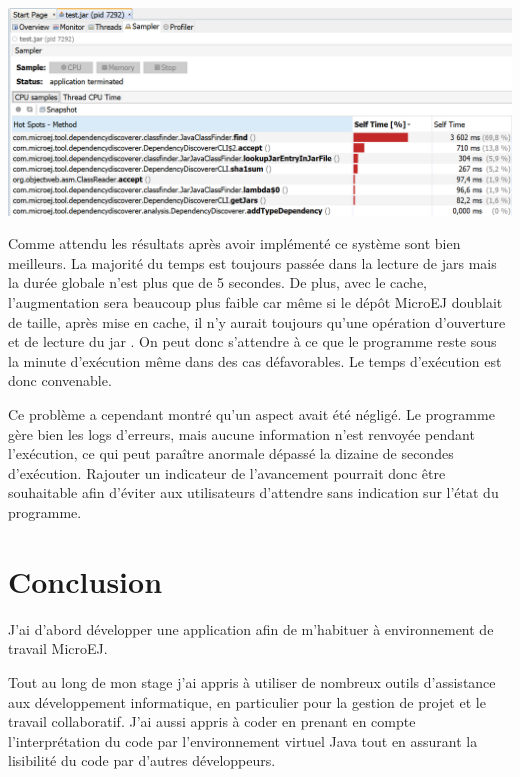 \documentclass[french,a4paper,12pt]{report}
\begin{document}
\begin{center}
\includegraphics[width=\textwidth]{./ressources/images/timeRepartitionByMethodsCachedsheer.png}
\end{center}

Comme attendu les résultats après avoir implémenté ce système sont bien meilleurs.
La majorité du temps est toujours passée dans la lecture de jars mais la durée globale n’est plus que de 5 secondes. De plus, avec le cache, l’augmentation sera beaucoup plus faible car même si le dépôt MicroEJ doublait de taille, après mise en cache, il n’y aurait toujours qu’une opération d’ouverture et de lecture du jar . On peut donc s’attendre à ce que le programme reste sous la minute d’exécution même dans des cas défavorables.  Le temps d’exécution est donc convenable.

Ce problème a cependant montré qu'un aspect avait été négligé. Le programme gère bien les logs d’erreurs, mais aucune information n’est renvoyée pendant l’exécution, ce qui peut paraître anormale dépassé la dizaine de secondes d’exécution. Rajouter un indicateur de l’avancement pourrait donc être souhaitable afin d’éviter aux utilisateurs d’attendre sans indication sur l’état du programme.


\chapter{Conclusion}



J'ai d'abord développer une application afin de m'habituer à environnement de travail MicroEJ.

Tout au long de mon stage j’ai appris à utiliser de nombreux outils d’assistance aux développement informatique, en particulier pour la gestion de projet et le travail collaboratif. J'ai aussi appris à coder en prenant en compte l’interprétation du code par l'environnement virtuel Java tout en assurant la lisibilité du code par d'autres développeurs.
\end{document}
